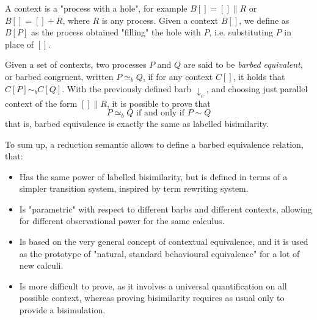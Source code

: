 A context is a "process with a hole", for example $B[] = [] \parallel R$ or $B[] = [] + R$, where $R$ is any process. Given a context $B[]$, we define as $B[P]$ as the process obtained "filling" the hole with $P$, i.e. substituting $P$ in place of $[]$.

Given a set of contexts, two processes $P$ and $Q$ are said to be \textit{barbed equivalent}, or barbed congruent, written $P \simeq_b Q$, if for any context $C[]$, it holds that $C[P] \sim_b C[Q]$. With the previously defined barb $\downarrow_c$, and choosing just parallel context of the form $[] \parallel R$, it is possible to prove that
\[P \simeq_b Q \text{ if and only if } P \sim Q\]
that is, barbed equivalence is exactly the same as labelled bisimilarity.

To sum up, a reduction semantic allows to define a barbed equivalence relation, that: \begin{itemize}
\item Has the same power of labelled bisimilarity, but is defined in terms of a simpler transition system, inspired by term rewriting system.
\item Is "parametric" with respect to different barbs and different contexts, allowing for different observational power for the same calculus.
\item Is based on the very general concept of contextual equivalence, and it is used as the prototype of "natural, standard behavioural equivalence" for a lot of new calculi.
\item Is more difficult to prove, as it involves a universal quantification on all possible context, whereas proving bisimilarity requires as usual only to provide a bisimulation.
\end{itemize}